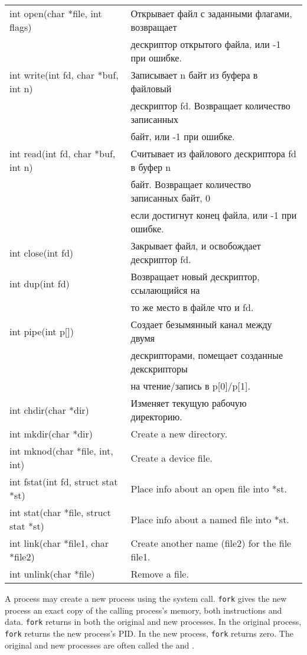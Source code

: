 \begin{longtable}[c]{l|l}
\hline
int open(char *file, int flags) & Открывает файл с заданными флагами, возвращает \\
                                & дескриптор открытого файла, или -1 при ошибке. \\
\hline
int write(int fd, char *buf, int n) & Записывает n байт из буфера в файловый \\
                                    & дескриптор fd. Возвращает количество записанных \\
                                    & байт, или -1 при ошибке. \\
\hline
int read(int fd, char *buf, int n) & Считывает из файлового дескриптора fd в буфер n \\
                                   & байт. Возвращает количество записанных байт, 0 \\
                                   & если достигнут конец файла, или -1 при ошибке. \\
\hline
int close(int fd) & Закрывает файл, и освобождает дескриптор fd. \\
\hline
int dup(int fd) & Возвращает новый дескриптор, ссылающийся на \\
                & то же место в файле что и fd.\\
\hline
int pipe(int p[]) & Создает безымянный канал между двумя \\
                  & дескрипторами, помещает созданные декскрипторы \\
                  & на чтение/запись в p[0]/p[1]. \\
\hline
int chdir(char *dir)                  & Изменяет текущую рабочую директорию. \\
\hline
int mkdir(char *dir)                  & Create a new directory. \\
\hline
int mknod(char *file, int, int)       & Create a device file. \\
\hline
int fstat(int fd, struct stat *st)    & Place info about an open file into *st. \\
\hline
int stat(char *file, struct stat *st) & Place info about a named file into *st. \\
\hline
int link(char *file1, char *file2)    & Create another name (file2) for the file file1. \\
\hline
int unlink(char *file)                & Remove a file. \\
\hline
\end{longtable}

A process may create a new process using the
system call.
\lstinline{fork}
gives the new process an exact copy of the calling
process's memory,
both instructions and data.
\lstinline{fork}
returns in both the original and new processes.
In the original process, \lstinline{fork} returns the new process's
PID.
In the new process, \lstinline{fork} returns zero.
The original and new processes are often called the
and
.

